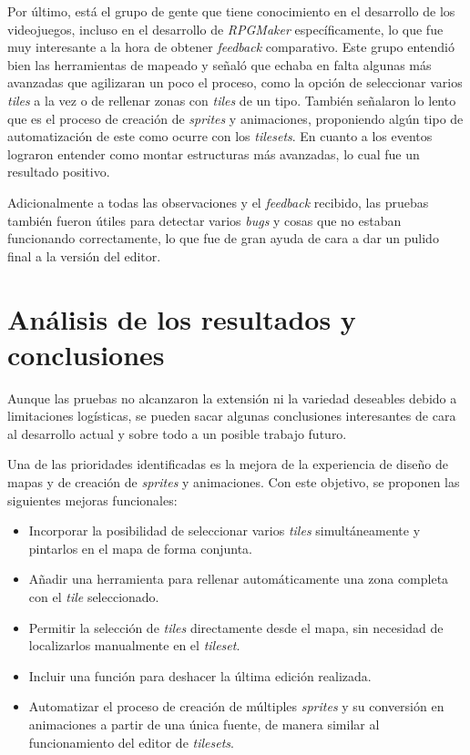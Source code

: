 \medskip

Por último, está el grupo de gente que tiene conocimiento en el desarrollo de los videojuegos, incluso en el desarrollo de \textit{RPGMaker} específicamente, lo que fue muy interesante a la hora de obtener \textit{feedback} comparativo. Este grupo entendió bien las herramientas de mapeado y señaló que echaba en falta algunas más avanzadas que agilizaran un poco el proceso, como la opción de seleccionar varios \textit{tiles} a la vez o de rellenar zonas con \textit{tiles} de un tipo. También señalaron lo lento que es el proceso de creación de \textit{sprites} y animaciones, proponiendo algún tipo de automatización de este como ocurre con los \textit{tilesets}. En cuanto a los eventos lograron entender como montar estructuras más avanzadas, lo cual fue un resultado positivo. 

\medskip

Adicionalmente a todas las observaciones y el \textit{feedback} recibido, las pruebas también fueron útiles para detectar varios \textit{bugs} y cosas que no estaban funcionando correctamente, lo que fue de gran ayuda de cara a dar un pulido final a la versión del editor. 

\section{Análisis de los resultados y conclusiones}
Aunque las pruebas no alcanzaron la extensión ni la variedad deseables debido a limitaciones logísticas, se pueden sacar algunas conclusiones interesantes de cara al desarrollo actual y sobre todo a un posible trabajo futuro.

\smallskip 

Una de las prioridades identificadas es la mejora de la experiencia de diseño de mapas y de creación de \textit{sprites} y animaciones. Con este objetivo, se proponen las siguientes mejoras funcionales:

\begin{itemize}
	\item Incorporar la posibilidad de seleccionar varios \textit{tiles} simultáneamente y pintarlos en el mapa de forma conjunta. 

	\item Añadir una herramienta para rellenar automáticamente una zona completa con el \textit{tile} seleccionado. 

	\item Permitir la selección de \textit{tiles} directamente desde el mapa, sin necesidad de localizarlos manualmente en el \textit{tileset}. 

	\item Incluir una función para deshacer la última edición realizada. 

	\item Automatizar el proceso de creación de múltiples \textit{sprites} y su conversión en animaciones a partir de una única fuente, de manera similar al funcionamiento del editor de \textit{tilesets}. 
\end{itemize}

